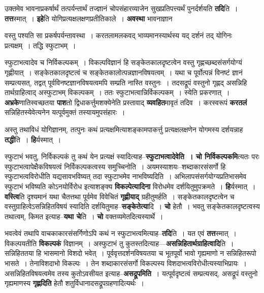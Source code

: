 \documentclass[article,12pt,a4paper]{memoir}
\begin{document}
	  \pstart उक्तमेव भावनाप्रकर्षार्थं तत्पर्यन्तार्थं तज्ज्ञानं चोपसंहारव्याजेन सुखप्रतिपत्त्यर्थं पुनर्दर्शयति \textbf{तदि}ति । \textbf{तत्त}स्मात् । \textbf{इहे}ति योगिप्रत्यक्षलक्षणप्रतीतिकाले । \textbf{अवस्था} भावनाज्ञान  \leavevmode{} 
	  
	वस्तु पश्यति सा प्रकर्षपर्यन्तावस्था । करतलामलकवद् भाव्यमानस्यार्थस्य यद् दर्शनं तद् योगिनः प्रत्यक्षम् । तद्धि स्फुटाभम् ।  
	  
	स्फुटाभत्वादेव च निर्विकल्पकम् । विकल्पविज्ञानं हि सङ्केतकालदृष्टत्वेन वस्तु गृह्णच्छब्दसंसर्गयोग्यं गृह्णीयात् । सङ्केतकालदृष्टत्वं च सङ्केतकालोत्पन्नज्ञानविषयत्वम् । यथा च पूर्वोत्पन्नं विनष्टं ज्ञानं सम्प्रत्यसत्, तद्वत् पूर्वविनष्टज्ञानविषयत्वमपि सम्प्रति नास्ति वस्तुनः । तदसद्रूपं वस्तुनो गृह्णद् असन्निहि तार्थग्राहित्वाद् अस्फुटाभम् विकल्पकम् । ततः स्फुटाभत्वान्निर्विकल्पकम् । स्येति प्रकरणात् । \textbf{अभ्रके}णातिस्वच्छतया \textbf{पाश}तो द्विधाकर्त्तुमशक्येनेति प्रस्तावाद् \textbf{व्यवहित}मावृतं तदिव । करस्वरूपं \textbf{करतलं} सन्निहितस्येवेत्यनेन यत्पूर्वमुक्तं\leavevmode{} तस्यायमुपसंहारः ।
	\pend
      

	  \pstart अस्तु तथाविधं योगिज्ञानम्, तत्पुनः कथं प्रत्यक्षमित्याशङ्कामपाकर्त्तु प्रत्यक्षलक्षणेन योगमस्य दर्शयन्नाह \textbf{तद्धी}ति । \textbf{हि}र्यस्मात् ।
	\pend
      

	  \pstart स्फुटाभं भवतु, निर्विकल्पकं तु कथं येन प्रत्यक्षं स्यादित्याह--\textbf{स्फुटाभत्वादेवेति । चो निर्विकल्पकमि}त्यतः परः स्फुटाभत्वापेक्षैकविषयत्वं निर्विकल्पकत्वस्य समुच्चिनोति । अयमस्याशयः--शब्दाकारसंसर्गो हि स्फुटाभत्वविरोधीति यद्यसावभविष्यत् तदा स्फुटाभमेव नाभविष्यदिति । अभिलापसंसर्गयोग्यप्रतिभासमेव स्फुटाभं भविष्यति कोऽनयोर्विरोध इत्याशङ्क्य \textbf{विकल्पेत्यादिना} विरोधमेव दर्शयितुमुपक्रमते । \textbf{हि}र्यस्मात् । \textbf{वस्त्वि}ति दृश्यमानं यथा चैतत्तथा पूर्वमेव विवेचितं \textbf{गृह्णीयाद्} ग्रहीतुमर्हति । सङ्केतकालदृष्टत्वेन च वस्तुग्राहित्वेऽसन्निहितविषयं स्यादिति दर्शयितुमाह--\textbf{सङ्केतेत्या}दि । \textbf{चो} हेतौ । भवतु सङ्केतकालदृष्टत्वस्य तथात्वम्, किमत इत्याह--\textbf{यथा चे}ति । \textbf{चो} वक्तव्यमेतदित्यस्यार्थे ।
	\pend
      

	  \pstart भवत्वेवं तथापि वाचकाकारसंसर्गिणोऽपि कथं न स्फुटाभत्वमित्याह--\textbf{तदि}ति । यत एवं \textbf{तत्त}स्मात् । विकल्पयतीति \textbf{विकल्पकं} विज्ञानम् । अस्फुटाभं तु कुतस्तदित्याह—\textbf{असन्निहितार्थग्राहित्वादि}ति । सन्निहिततया हि भासमानो विशदो भवेत् । पूर्ववृत्तदर्शनविषयतया च भूतपूर्वो भावो गृह्यमाणो न सन्निहितरूपो भासते । तेनाविशदाभो विकल्पः । तेन शब्दाकारसंसर्गो विकल्पस्य विशदाभत्वविरोधीत्यस्याभिप्रायः । असन्निहितविषयत्वमेव तस्य कुतोऽवसीयत इत्याह--\textbf{असद्रूपमिति} । यत्पूर्वदृष्टत्वं सम्प्रत्यसद्, असद्रूपं वस्तुनो गृह्यमाणस्य \textbf{गृह्णदिति} हेतौ शतुर्विधानादसद्रूपग्रहणादित्यर्थः ।
	\pend
      
\end{document}
